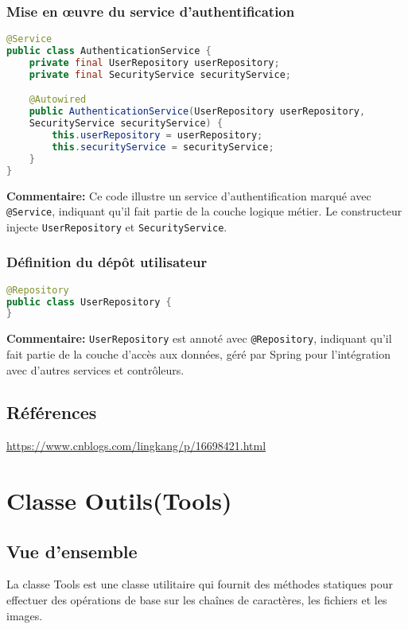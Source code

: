 \documentclass{article}
\begin{document}
\subsubsection{Mise en œuvre du service d'authentification}
\begin{lstlisting}[language=Java]
@Service
public class AuthenticationService {
    private final UserRepository userRepository;
    private final SecurityService securityService;

    @Autowired
    public AuthenticationService(UserRepository userRepository, 
    SecurityService securityService) {
        this.userRepository = userRepository;
        this.securityService = securityService;
    }
}
\end{lstlisting}
\textbf{Commentaire:} Ce code illustre un service d'authentification marqué avec \texttt{@Service}, indiquant qu'il fait partie de la couche logique métier. Le constructeur injecte \texttt{UserRepository} et \texttt{SecurityService}.

\subsubsection{Définition du dépôt utilisateur}
\begin{lstlisting}[language=Java]
@Repository
public class UserRepository {
}
\end{lstlisting}
\textbf{Commentaire:} \texttt{UserRepository} est annoté avec \texttt{@Repository}, indiquant qu'il fait partie de la couche d'accès aux données, géré par Spring pour l'intégration avec d'autres services et contrôleurs.

\subsection{Références}
\href{https://www.cnblogs.com/lingkang/p/16698421.html}{https://www.cnblogs.com/lingkang/p/16698421.html}
\section{}


\section{Classe Outils(Tools)}
\subsection{Vue d'ensemble}
La classe Tools est une classe utilitaire qui fournit des méthodes statiques pour effectuer des opérations de base sur les chaînes de caractères, les fichiers et les images.
\end{document}
